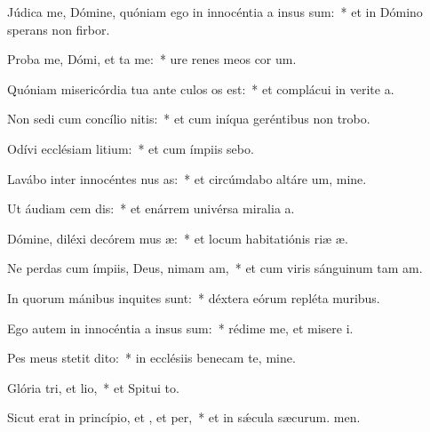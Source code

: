 \item Júdica me, Dómine, quóniam ego in innocéntia a insus sum:~* et in Dómino sperans non firbor.
\item Proba me, Dómi, et ta me:~* ure renes meos  cor um.
\item Quóniam misericórdia tua ante culos os est:~* et complácui in verite a.
\item Non sedi cum concílio nitis:~* et cum iníqua geréntibus non trobo.
\item Odívi ecclésiam litium:~* et cum ímpiis  sebo.
\item Lavábo inter innocéntes nus as:~* et circúmdabo altáre um, mine.
\item Ut áudiam cem dis:~* et enárrem univérsa miralia a.
\item Dómine, diléxi decórem mus æ:~* et locum habitatiónis riæ æ.
\item Ne perdas cum ímpiis, Deus, nimam am,~* et cum viris sánguinum tam am.
\item In quorum mánibus inquites sunt:~* déxtera eórum repléta  muribus.
\item Ego autem in innocéntia a insus sum:~* rédime me, et misere i.
\item Pes meus stetit  dito:~* in ecclésiis benecam te, mine.
\item Glória tri, et lio,~* et Spitui to.
\item Sicut erat in princípio, et , et per,~* et in sǽcula sæcurum. men.
